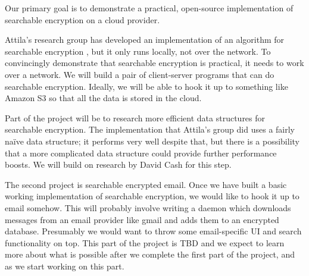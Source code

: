 \documentclass[onecolumn, draftclsnofoot,10pt, compsoc]{IEEEtran}
\begin{document}
Our primary goal is to demonstrate a practical, open-source implementation of searchable encryption on a cloud provider.




Attila's research group has developed an implementation of an algorithm for searchable encryption \cite{yavuz17},
but it only runs locally, not over the network.
To convincingly demonstrate that searchable encryption is practical, it needs to work over a network.
We will build a pair of client-server programs that can do searchable encryption.
Ideally, we will be able to hook it up to something like Amazon S3 so that all the data is stored in the cloud.


Part of the project will be to research more efficient data structures for searchable encryption.
The implementation that Attila's group did uses a fairly na\"ive data structure;
it performs very well despite that, but there is a possibility that a more complicated data structure could provide further performance boosts.
We will build on research by David Cash for this step.
\cite{cryptoeprint:2014:853}



The second project is searchable encrypted email.
Once we have built a basic working implementation of searchable encryption,
we would like to hook it up to email somehow.
This will probably involve writing a daemon which downloads messages from an email provider like gmail
and adds them to an encrypted database.
Presumably we would want to throw some email-specific UI and search functionality on top.
This part of the project is TBD and we expect to learn more about what is possible after we complete the first part of the project, and as we start working on this part.
\end{document}
